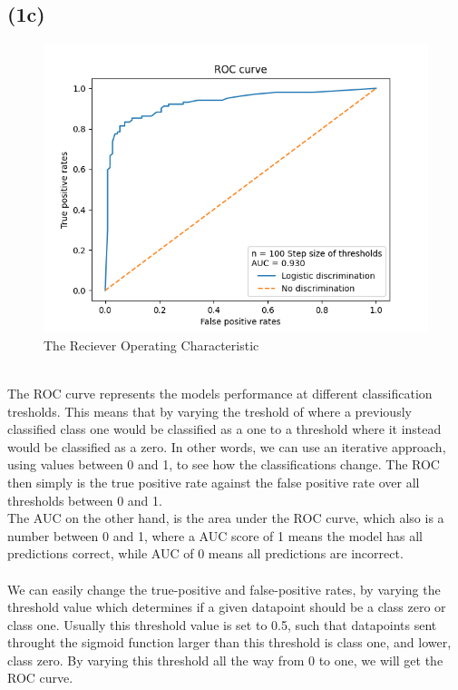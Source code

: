 \documentclass[12pt, letterpaper]{article}
\begin{document}
    \subsection*{(1c)}
      \begin{figure}[H]
        \caption{The Reciever Operating Characteristic}
        \centering
        \includegraphics[width=14cm]{ROC}
      \end{figure}\\
      The ROC curve represents the models performance at different classification tresholds. This means that by varying the treshold of where a previously classified class one would be classified as a one to a threshold where it instead would be classified as a zero. In other words, we can use an iterative approach, using values between 0 and 1, to see how the classifications change. The ROC then simply is the true positive rate against the false positive rate over all thresholds between 0 and 1.\\
      The AUC on the other hand, is the area under the ROC curve, which also is a number between 0 and 1, where a AUC score of 1 means the model has all predictions correct, while AUC of 0 means all predictions are incorrect.\\ \\
      We can easily change the true-positive and false-positive rates, by varying the threshold value which determines if a given datapoint should be a class zero or class one. Usually this threshold value is set to 0.5, such that datapoints sent throught the sigmoid function larger than this threshold is class one, and lower, class zero. By varying this threshold all the way from 0 to one, we will get the ROC curve.\\
\end{document}

